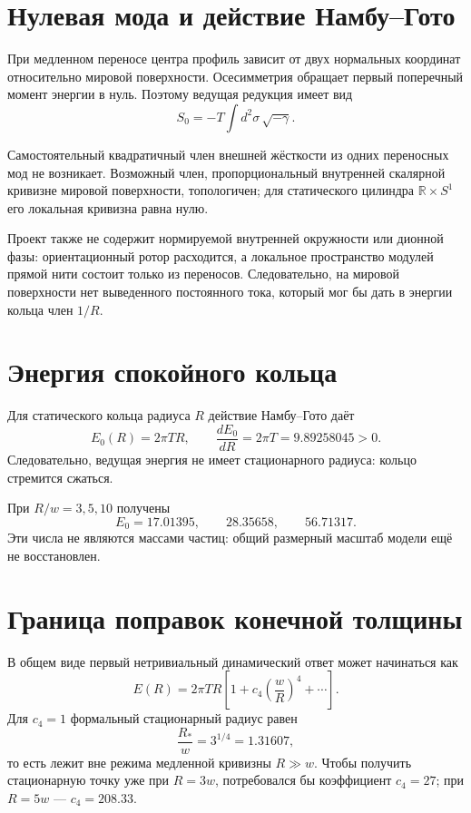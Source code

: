 \section{Нулевая мода и действие Намбу--Гото}

При медленном переносе центра профиль зависит от двух нормальных координат
относительно мировой поверхности. Осесимметрия обращает первый поперечный
момент энергии в нуль. Поэтому ведущая редукция имеет вид
\begin{equation}
 S_0=-T\int d^2\sigma\,\sqrt{-\gamma}.
\end{equation}

Самостоятельный квадратичный член внешней жёсткости из одних переносных мод
не возникает. Возможный член, пропорциональный внутренней скалярной кривизне
мировой поверхности, топологичен; для статического цилиндра
$\mathbb R\times S^1$ его локальная кривизна равна нулю.

Проект также не содержит нормируемой внутренней окружности или дионной фазы:
ориентационный ротор расходится, а локальное пространство модулей прямой
нити состоит только из переносов. Следовательно, на мировой поверхности нет
выведенного постоянного тока, который мог бы дать в энергии кольца член
$1/R$.

\section{Энергия спокойного кольца}

Для статического кольца радиуса $R$ действие Намбу--Гото даёт
\begin{equation}
 E_0(R)=2\pi T R,
 \qquad
 \frac{dE_0}{dR}=2\pi T=9.89258045>0.
\end{equation}
Следовательно, ведущая энергия не имеет стационарного радиуса: кольцо
стремится сжаться.

При $R/w=3,5,10$ получены
\begin{equation}
 E_0=17.01395,
 \qquad 28.35658,
 \qquad 56.71317.
\end{equation}
Эти числа не являются массами частиц: общий размерный масштаб модели ещё не
восстановлен.

\section{Граница поправок конечной толщины}

В общем виде первый нетривиальный динамический ответ может начинаться как
\begin{equation}
 E(R)=2\pi T R
 \left[1+c_4\left(\frac wR\right)^4+\cdots\right].
\end{equation}
Для $c_4=1$ формальный стационарный радиус равен
\begin{equation}
 \frac{R_*}{w}=3^{1/4}=1.31607,
\end{equation}
то есть лежит вне режима медленной кривизны $R\gg w$. Чтобы получить
стационарную точку уже при $R=3w$, потребовался бы коэффициент
$c_4=27$; при $R=5w$ --- $c_4=208.33$.

